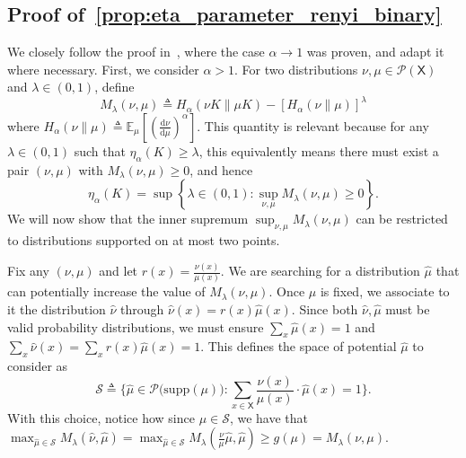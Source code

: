 \documentclass[conference,letterpaper]{IEEEtran}
\def \X{\mathsf X}
\def \calS{\mathcal S}
\newcommand{\dd}[1]{\mathrm{d}#1}
\newcommand{\mean}[2]{\mathbb{E}_{#1}\left[#2\right]}
\begin{document}
\subsection{Proof of~\cref{prop:eta_parameter_renyi_binary}}\label{appendix:proof_eta_parameter_renyi_binary}\noindent
    We closely follow the proof in~\cite{ordentlich2021strong}, where the case $\alpha\to1$ was proven, and adapt it where necessary. 
    First, we consider $\alpha>1$. For two distributions $\nu, \mu \in \mathcal{P}(\X)$ and $\lambda\in(0,1)$, define
    \begin{equation*}
        M_{\lambda}(\nu, \mu) \triangleq H_{\alpha}(\nu K \| \mu K) - \left[H_{\alpha}(\nu \| \mu)\right]^{\lambda}
    \end{equation*}
    where $H_\alpha(\nu \| \mu) \triangleq \mean{\mu}{\left(\frac{\dd \nu}{\dd \mu}\right)^{\alpha}}$. This quantity is relevant because for any $\lambda\in(0,1)$ such that  $\eta_\alpha(K)\geq \lambda$, this equivalently means there must exist a pair $(\nu, \mu)$ with $M_\lambda(\nu, \mu)\geq 0$, and hence
    \begin{equation*}
        \eta_{\alpha}(K) = \sup\left\{\lambda\in(0,1): \sup_{\nu, \mu} M_\lambda(\nu, \mu)\geq 0\right\}.
    \end{equation*}
    We will now show that the inner supremum $\sup_{\nu, \mu} M_\lambda(\nu, \mu)$ can be restricted to distributions supported on at most two points.

    Fix any $(\nu, \mu)$ and let $r(x)=\frac{\nu(x)}{\mu(x)}$. We are searching for a distribution $\hat{\mu}$ that can potentially increase the value of $M_\lambda(\nu, \mu)$. Once $\hat{\mu}$ is fixed, we associate to it the distribution $\hat{\nu}$ through $\hat{\nu}(x)=r(x)\hat{\mu}(x)$. Since both $\hat{\nu}, \hat{\mu}$ must be valid probability distributions, we must ensure $\sum_x\hat{\mu}(x)=1$ and $\sum_x\hat{\nu}(x)=\sum_x r(x)\hat{\mu}(x)=1$. This defines the space of potential $\hat{\mu}$ to consider as
    \begin{equation}
        \calS\triangleq \bigg\{\hat{\mu}\in\mathcal{P}\big(\mathrm{supp}(\mu)\big): \sum_{x\in\X} \frac{\nu(x)}{\mu(x)}\cdot \hat{\mu}(x)=1 \bigg\}.\nonumber
    \end{equation}
    With this choice, notice how since $\mu\in\calS$, we have that $\max_{\hat{\mu}\in\calS} M_{\lambda}(\hat{\nu},\hat{\mu}) = \max_{\hat{\mu}\in\calS} M_{\lambda}\left(\frac{\nu}{\mu}\hat{\mu},\hat{\mu}\right)\geq g(\mu) = M_{\lambda}(\nu,\mu)$.
\end{document}
